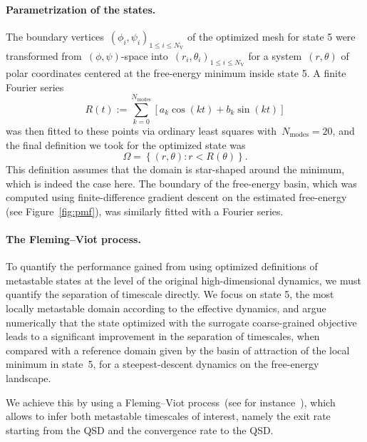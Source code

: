 \documentclass[a4]{article}
\newcommand{\1}{\mathbbm 1}
\begin{document}
\paragraph{Parametrization of the states.}
The boundary vertices~$(\phi_i,\psi_i)_{1\leq i\leq N_{\mathrm{V}}}$ of the optimized mesh for state 5 were transformed from~$(\phi,\psi)$-space into~$(r_i,\theta_i)_{1\leq i\leq N_{\mathrm{V}}}$ for a system~$(r,\theta)$ of polar coordinates centered at the free-energy minimum inside state 5. A finite Fourier series
\begin{equation}
    R(t):=\sum_{k=0}^{N_{\mathrm{modes}}}\left[a_k \cos(kt) + b_k\sin(kt)\right]
\end{equation}
was then fitted to these points via ordinary least squares with~$N_{\mathrm{modes}}=20$, and the final definition we took for the optimized state was
\begin{equation}
    \Omega =\left\{(r,\theta):r<R(\theta)\right\}.
\end{equation}
This definition assumes that the domain is star-shaped around the minimum, which is indeed the case here.
The boundary of the free-energy basin, which was computed using finite-difference gradient descent on the estimated free-energy (see Figure~\ref{fig:pmf}), was similarly fitted with a Fourier series.

\paragraph{The Fleming--Viot process.}
To quantify the performance gained from using optimized definitions of metastable states at the level of the original high-dimensional dynamics, we must quantify the separation of timescale directly.
We focus on state 5, the most locally metastable domain according to the effective dynamics, and argue numerically that the state optimized with the surrogate coarse-grained objective leads to a significant improvement in the separation of timescales, when compared with a reference domain given by the basin of attraction of the local minimum in state~5, for a steepest-descent dynamics on the free-energy landscape.

We achieve this by using a Fleming--Viot process~(see for instance~\cite{DMM00}), which allows to infer both metastable timescales of interest, namely the exit rate starting from the QSD and the convergence rate to the QSD. 
\end{document}
